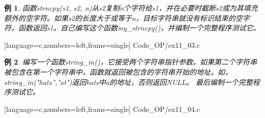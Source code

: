 \documentclass[10pt,notheorems]{beamer}
\newtheorem{li}{例}
\begin{document}
\begin{frame}[fragile]
\begin{li} 
函数{\tf strncpy(s1, s2, n)}从{\tf s2}复制{\tf n}个字符给{\tf s1}，并在必要时截断{\tf s2}或为其填充额外的空字符。如果{\tf s2}的长度大于或等于{\tf n}，目标字符串就没有标识结束的空字符。函数返回{\tf s1}。自己编写这个函数{\tf my\_strncpy()}，并编制一个完整程序测试它。
\end{li}
\end{frame}


\begin{frame}

[language=c,numbers=left,frame=single]
{Code_OP/ex11_03.c}
\end{frame}




\begin{frame}[fragile]
\begin{li} 
编写一个函数{\tf string\_in()}，它接受两个字符串指针参数。如果第二个字符串被包含在第一个字符串中，函数就返回被包含的字符串开始的地址。如，{\tf string\_in("hats'',"at")}返回{\tf hats}中{\tf a}的地址，否则返回{\tf NULL}。 最后编制一个完整程序测试它。
\end{li}
\end{frame}


\begin{frame}

[language=c,numbers=left,frame=single]
{Code_OP/ex11_04.c}
\end{frame}
\end{document}
